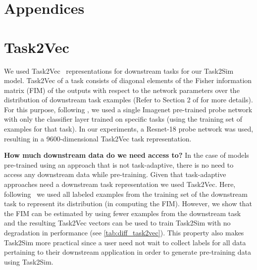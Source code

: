 \appendix

\section*{Appendices}

\section{Task2Vec}
We used Task2Vec~\cite{achille2019task2vec} representations for downstream tasks for our Task2Sim model. Task2Vec of a task consists of diagonal elements of the Fisher information matrix (FIM) of the outputs with respect to the network parameters over the distribution of downstream task examples (Refer to Section 2 of \cite{achille2019task2vec} for more details). For this purpose, following \cite{achille2019task2vec}, we used a single Imagenet pre-trained probe network with only the classifier layer trained on specific tasks (using the training set of examples for that task). In our experiments, a Resnet-18 probe network was used, resulting in a 9600-dimensional Task2Vec task representation.

\vspace{1mm}
\noindent \textbf{How much downstream data do we need access to?} In the case of models pre-trained using an approach that is not task-adaptive, there is no need to access any downstream data while pre-training. Given that task-adaptive approaches need a downstream task representation we used Task2Vec. Here, following~\cite{achille2019task2vec} we used all labeled examples from the training set of the downstream task to represent its distribution (in computing the FIM). However, we show that the FIM can be estimated by using fewer examples from the downstream task and the resulting Task2Vec vectors can be used to train Task2Sim with no degradation in performance (see \cref{tab:diff_task2vec}). This property also makes Task2Sim more practical since a user need not wait to collect labels for all data pertaining to their downstream application in order to generate pre-training data using Task2Sim.

